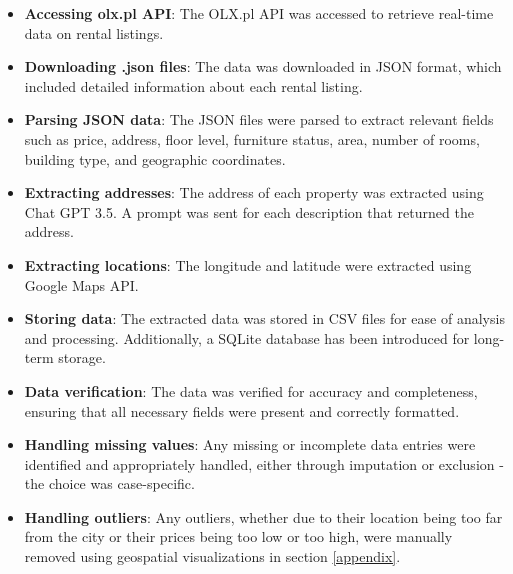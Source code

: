 \begin{itemize}
    \item \textbf{Accessing olx.pl API}: The OLX.pl API was accessed to retrieve real-time data on rental listings.
    \item \textbf{Downloading .json files}: The data was downloaded in JSON format, which included detailed information about each rental listing.
    \item \textbf{Parsing JSON data}: The JSON files were parsed to extract relevant fields such as price, address, floor level, furniture status, area, number of rooms, building type, and geographic coordinates.
    \item \textbf{Extracting addresses}: The address of each property was extracted using Chat GPT 3.5. A prompt was sent for each description that returned the address.
    \item \textbf{Extracting locations}: The longitude and latitude were extracted using Google Maps API.
    \item \textbf{Storing data}: The extracted data was stored in CSV files for ease of analysis and processing. Additionally, a SQLite database has been introduced for long-term storage.
    \item \textbf{Data verification}: The data was verified for accuracy and completeness, ensuring that all necessary fields were present and correctly formatted.
    \item \textbf{Handling missing values}: Any missing or incomplete data entries were identified and appropriately handled, either through imputation or exclusion - the choice was case-specific.
    \item \textbf{Handling outliers}: Any outliers, whether due to their location being too far from the city or their prices being too low or too high, were manually removed using geospatial visualizations in section \ref{appendix}.
\end{itemize}

